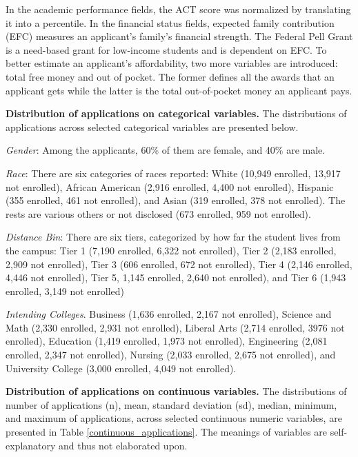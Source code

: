 \documentclass[12pt,english]{report}
\begin{document}
In the academic performance fields, the ACT score was normalized by translating it into a percentile.
In the financial status fields, expected family contribution (EFC) measures an applicant's family's financial strength. The Federal Pell Grant is a need-based grant for low-income students and is dependent on EFC. To better estimate an applicant's affordability, two more variables are introduced: total free money and out of pocket. The former defines all the awards that an applicant gets while the latter is the total out-of-pocket money an applicant pays.


\vspace{0.15in}
\noindent \textbf{Distribution of applications on categorical  variables. }  The distributions of applications across selected categorical  variables are presented below. 

\noindent \textit{Gender}: Among the applicants, 60\% of them are female, and 40\% are male.  

\noindent \textit{Race}:  There are six categories of races reported: White (10,949 enrolled, 13,917 not enrolled), African American (2,916 enrolled, 4,400 not enrolled), Hispanic (355 enrolled, 461 not enrolled), and Asian (319 enrolled, 378 not enrolled).  The rests are various others or not disclosed (673 enrolled, 959 not enrolled).

\noindent \textit{Distance Bin}: There are six tiers, categorized by how far the student lives from the campus:  Tier 1 (7,190 enrolled, 6,322 not enrolled), Tier 2 (2,183 enrolled, 2,909 not enrolled), Tier 3 (606 enrolled, 672 not enrolled), Tier 4 (2,146 enrolled, 4,446 not enrolled), Tier 5, 1,145 enrolled, 2,640 not enrolled), and Tier 6 (1,943 enrolled,  3,149 not enrolled) 

\noindent \textit{Intending Colleges}.  Business  (1,636 enrolled, 2,167 not enrolled), Science and Math (2,330 enrolled, 2,931 not enrolled), Liberal Arts (2,714 enrolled, 3976 not enrolled), Education (1,419 enrolled, 1,973 not enrolled), Engineering  (2,081 enrolled, 2,347 not enrolled), Nursing (2,033 enrolled, 2,675 not enrolled), and University College (3,000 enrolled, 4,049 not enrolled). 


\vspace{0.15in}
\noindent \textbf{Distribution of applications on continuous  variables. }  The distributions of number of applications (n), mean, standard deviation (sd), median, minimum, and maximum of applications, across selected continuous numeric variables, are presented in  Table \ref{continuous_applications}.  The meanings of variables are self-explanatory and thus not elaborated upon.
\end{document}
